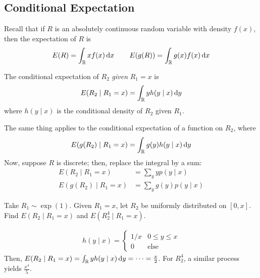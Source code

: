 \subsection{Conditional Expectation}
Recall that if $R$ is an absolutely continuous random variable with density $f(x)$, then the expectation of $R$ is
\begin{align}
    E(R) = \int_\real x f(x) \dd{x} \qsp E(g(R)) = \int_\real g(x) f(x) \dd{x}
\end{align}
\begin{definition}
    The conditional expectation of $R_2$ \textit{given} $R_1 = x$ is
    \begin{align}
        E(R_2 \mid R_1 = x) = \int_{\mathbb{R}} y h(y \mid x) \dd{y}
    \end{align}
    where $h(y \mid x)$ is the conditional density of $R_2$ given $R_1$.
\end{definition}
The same thing applies to the conditional expectation of a function on $R_2$, where
\begin{align}
    E(g(R_2) \mid R_1 = x) = \int_{\mathbb{R}} g(y) h(y \mid x) \dd{y}
\end{align}
Now, suppose $R$ is discrete; then, replace the integral by a sum:
\begin{align}
    E(R_2 \mid R_1 = x) &= \sum_y y p(y \mid x)\\
    E(g(R_2) \mid R_1 = x) &= \sum_y g(y) p(y \mid x)
\end{align}
\begin{example}
    Take $R_1 \sim \exp(1)$. Given $R_1 = x$, let $R_2$ be uniformly distributed on $[0,x]$. Find $E(R_2 \mid R_1 = x)$ and $E(R_2^4 \mid R_1 = x)$.
\end{example}
\begin{solution}
    \begin{align}
        h(y \mid x) = \begin{cases}
            1/x & 0 \le y \le x\\
            0 & \text{else}
        \end{cases}
    \end{align}
    Then, $E(R_2 \mid R_1 = x) = \int_{\mathbb{R}} y h(y \mid x) \dd{y} = \cdots = \frac{x}{2}$. For $R_2^4$, a similar process yields $\frac{x^4}{5}$. 
\end{solution}

